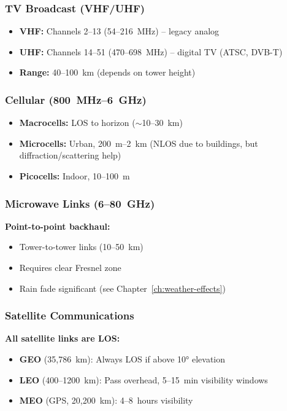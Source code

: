 \subsubsection{TV Broadcast (VHF/UHF)}

\begin{itemize}
\item \textbf{VHF:} Channels 2--13 (54--216~MHz) -- legacy analog
\item \textbf{UHF:} Channels 14--51 (470--698~MHz) -- digital TV (ATSC, DVB-T)
\item \textbf{Range:} 40--100~km (depends on tower height)
\end{itemize}

\subsubsection{Cellular (800~MHz--6~GHz)}

\begin{itemize}
\item \textbf{Macrocells:} LOS to horizon ($\sim$10--30~km)
\item \textbf{Microcells:} Urban, 200~m--2~km (NLOS due to buildings, but diffraction/scattering help)
\item \textbf{Picocells:} Indoor, 10--100~m
\end{itemize}

\subsubsection{Microwave Links (6--80~GHz)}

\textbf{Point-to-point backhaul:}
\begin{itemize}
\item Tower-to-tower links (10--50~km)
\item Requires clear Fresnel zone
\item Rain fade significant (see Chapter~\ref{ch:weather-effects})
\end{itemize}

\subsubsection{Satellite Communications}

\textbf{All satellite links are LOS:}
\begin{itemize}
\item \textbf{GEO} (35,786~km): Always LOS if above 10° elevation
\item \textbf{LEO} (400--1200~km): Pass overhead, 5--15~min visibility windows
\item \textbf{MEO} (GPS, 20,200~km): 4--8~hours visibility
\end{itemize}

